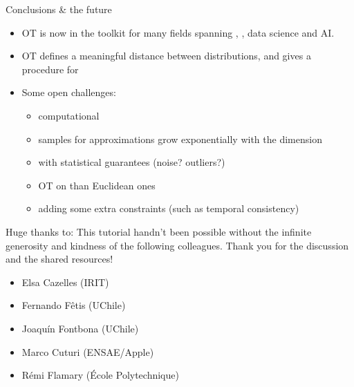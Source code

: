 \documentclass[pdf,aspectratio=169,10pt]{beamer}
\begin{document}
\begin{frame}{Conclusions \& the future}
    \begin{itemize}
        \itemsep1em  
        \item OT is now in the toolkit for many fields spanning , , data science and AI.
        \item OT defines a meaningful distance between distributions, and gives a procedure for 
        \item Some open challenges: 
        \begin{itemize}
            \item computational 
            \item {} samples for approximations grow exponentially with the dimension
            \item {} with statistical guarantees (noise? outliers?)
            \item OT on  than Euclidean ones
            \item adding some extra constraints (such as temporal consistency)
        \end{itemize}
        \end{itemize}
\end{frame}

\begin{frame}{Huge thanks to:}
This tutorial handn't been possible without the infinite generosity and kindness of the following colleagues. Thank you for the discussion and the shared resources! 
\vspace{1em}
    \begin{itemize}
        \item Elsa Cazelles (IRIT)
        \item Fernando Fêtis (UChile)
        \item Joaquín Fontbona (UChile)
        \item Marco Cuturi (ENSAE/Apple)
        \item Rémi Flamary (École Polytechnique)
    \end{itemize}
\end{frame}








\begin{frame}[plain]
    \titlepage
\end{frame}
\end{document}
